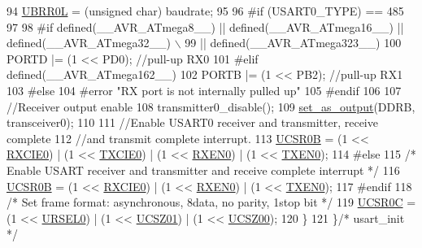 \begin{DoxyCode}
94         \hyperlink{usartm8_8h_ae96d0b97b754e1958c734dfb9d37f9ee}{UBRR0L} = (\textcolor{keywordtype}{unsigned} char) baudrate;
95 
96 \textcolor{preprocessor}{#if (USART0\_TYPE) == 485
}
97 \textcolor{preprocessor}{}
98 \textcolor{preprocessor}{#if  defined(\_\_AVR\_ATmega8\_\_)  || defined(\_\_AVR\_ATmega16\_\_) || defined(\_\_AVR\_ATmega32\_\_) \(\backslash\)
}
99 \textcolor{preprocessor}{  || defined(\_\_AVR\_ATmega323\_\_)
}
100 \textcolor{preprocessor}{}        PORTD |= (1 << PD0); \textcolor{comment}{//pull-up RX0}
101 \textcolor{preprocessor}{#elif defined(\_\_AVR\_ATmega162\_\_)
}
102 \textcolor{preprocessor}{}        PORTB |= (1 << PB2); \textcolor{comment}{//pull-up RX1}
103 \textcolor{preprocessor}{#else
}
104 \textcolor{preprocessor}{}\textcolor{preprocessor}{#error "RX port is not internally pulled up"
}
105 \textcolor{preprocessor}{}\textcolor{preprocessor}{#endif
}
106 \textcolor{preprocessor}{}
107         \textcolor{comment}{//Receiver output enable}
108         transmitter0\_disable();
109         \hyperlink{group__biba__config_ga91fb0adcf6533b4acfe793396836badc}{set\_as\_output}(DDRB, transceiver0);
110 
111         \textcolor{comment}{//Enable USART0 receiver and transmitter, receive complete}
112         \textcolor{comment}{//and transmit complete interrupt.}
113         \hyperlink{usartm8_8h_a2ded98d79bd558dff7d52298728fd9b8}{UCSR0B} = (1 << \hyperlink{usartm8_8h_a790906757f759fad4325c63ac3b0c9ab}{RXCIE0}) | (1 << \hyperlink{usartm8_8h_a81c6f3daa20eb28ecc75337bee559c84}{TXCIE0}) | (1 << \hyperlink{usartm8_8h_ac11695cf8ce78bca8074ddc11da43586}{RXEN0}) | (1 << 
      \hyperlink{usartm8_8h_a85ebab0cc6f7f45060a63ae97c32d38f}{TXEN0});
114 \textcolor{preprocessor}{#else
}
115 \textcolor{preprocessor}{}        \textcolor{comment}{/* Enable USART receiver and transmitter and receive complete interrupt */}
116         \hyperlink{usartm8_8h_a2ded98d79bd558dff7d52298728fd9b8}{UCSR0B} = (1 << \hyperlink{usartm8_8h_a790906757f759fad4325c63ac3b0c9ab}{RXCIE0}) | (1 << \hyperlink{usartm8_8h_ac11695cf8ce78bca8074ddc11da43586}{RXEN0}) | (1 << \hyperlink{usartm8_8h_a85ebab0cc6f7f45060a63ae97c32d38f}{TXEN0});
117 \textcolor{preprocessor}{#endif
}
118 \textcolor{preprocessor}{}        \textcolor{comment}{/* Set frame format: asynchronous, 8data, no parity, 1stop bit */}
119         \hyperlink{usartm8_8h_ac337badc6764b225812868e8d330d765}{UCSR0C} = (1 << \hyperlink{usartm8_8h_a28b7b2e4d53a8ebf645fdb2550100809}{URSEL0}) | (1 << \hyperlink{usartm8_8h_a58d3de3766761188ebe46268a9556960}{UCSZ01}) | (1 << \hyperlink{usartm8_8h_a5860c8afad33f2c2ef4fc6d929deb6bd}{UCSZ00});
120     \}
121 \}\textcolor{comment}{/* usart\_init */}
\end{DoxyCode}


